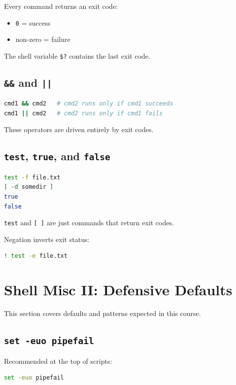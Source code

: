 \documentclass{../juni}
\begin{document}
Every command returns an exit code:
\begin{itemize}
  \item \texttt{0} = success
  \item non-zero = failure
\end{itemize}

The shell variable \texttt{\$?} contains the last exit code.

\subsection{\texttt{\&\&} and \texttt{||}}

\begin{lstlisting}[language=bash]
cmd1 && cmd2   # cmd2 runs only if cmd1 succeeds
cmd1 || cmd2   # cmd2 runs only if cmd1 fails
\end{lstlisting}

These operators are driven entirely by exit codes.

\subsection{\texttt{test}, \texttt{true}, and \texttt{false}}

\begin{lstlisting}[language=bash]
test -f file.txt
[ -d somedir ]
true
false
\end{lstlisting}

\texttt{test} and \texttt{[ ]} are just commands that return exit codes.

Negation inverts exit status:

\begin{lstlisting}[language=bash]
! test -e file.txt
\end{lstlisting}

\newpage
\section{Shell Misc II: Defensive Defaults}

This section covers defaults and patterns expected in this course.

\subsection{\texttt{set -euo pipefail}}

Recommended at the top of scripts:

\begin{lstlisting}[language=bash]
set -euo pipefail
\end{lstlisting}
\end{document}
